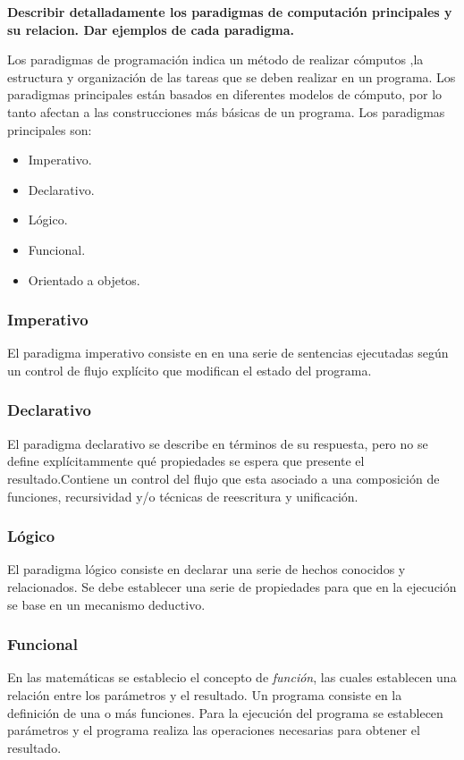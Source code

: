 \item \textbf{Describir detalladamente los paradigmas de computación principales y su relacion. Dar ejemplos de cada paradigma.}

Los paradigmas de programación indica un método de realizar cómputos ,la estructura y organización de las tareas que se deben realizar en un programa. Los paradigmas principales están basados en diferentes modelos de cómputo, por lo tanto afectan a las construcciones más básicas de un programa. Los paradigmas principales son:
\begin{itemize}
      \item Imperativo.
      \item Declarativo.
      \item Lógico.
      \item Funcional.
      \item Orientado a objetos.
\end{itemize}
\subsubsection*{Imperativo}
El paradigma imperativo consiste en en una serie de sentencias ejecutadas según un control de flujo explícito que modifican el estado del programa.
\subsubsection*{Declarativo}
El paradigma declarativo se describe en términos de su respuesta, pero no se define explícitammente qué propiedades se espera que presente el resultado\cite{Daintith_2008}.Contiene un control del flujo que esta asociado a una composición de funciones, recursividad y/o técnicas de reescritura y unificación.
\subsubsection*{Lógico}
El paradigma lógico consiste en declarar una serie de hechos conocidos y relacionados. Se debe establecer una serie de propiedades para que en la ejecución se base en un mecanismo deductivo.
\cite{satori_2021,rodriguez_2003}
\subsubsection*{Funcional}
En las matemáticas se establecio el concepto de \textit{función}, las cuales establecen una relación entre los parámetros y el resultado. Un programa consiste en la definición de una o más funciones. Para la ejecución del programa se establecen parámetros y el programa realiza las operaciones necesarias para obtener el resultado.\cite{Fokker_1996}
